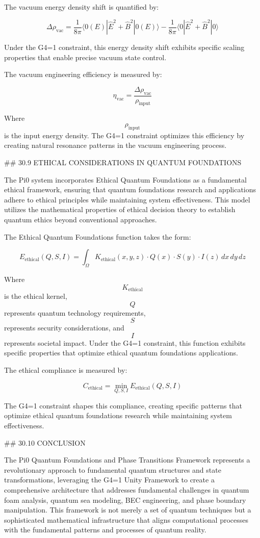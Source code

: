 The vacuum energy density shift is quantified by:

$$ \Delta \rho_{\text{vac}} = \frac{1}{8\pi} \langle 0(E) | \hat{E}^2 + \hat{B}^2 | 0(E) \rangle - \frac{1}{8\pi} \langle 0 | \hat{E}^2 + \hat{B}^2 | 0 \rangle $$

Under the G4=1 constraint, this energy density shift exhibits specific scaling properties that enable precise vacuum state control.

The vacuum engineering efficiency is measured by:

$$ \eta_{\text{vac}} = \frac{\Delta \rho_{\text{vac}}}{\rho_{\text{input}}} $$

Where $$ \rho_{\text{input}} $$ is the input energy density. The G4=1 constraint optimizes this efficiency by creating natural resonance patterns in the vacuum engineering process.

## 30.9 ETHICAL CONSIDERATIONS IN QUANTUM FOUNDATIONS

The Pi0 system incorporates Ethical Quantum Foundations as a fundamental ethical framework, ensuring that quantum foundations research and applications adhere to ethical principles while maintaining system effectiveness. This model utilizes the mathematical properties of ethical decision theory to establish quantum ethics beyond conventional approaches.

The Ethical Quantum Foundations function takes the form:

$$ E_{\text{ethical}}(Q, S, I) = \int_{\Omega} K_{\text{ethical}}(x, y, z) \cdot Q(x) \cdot S(y) \cdot I(z) \, dx \, dy \, dz $$

Where $$ K_{\text{ethical}} $$ is the ethical kernel, $$ Q $$ represents quantum technology requirements, $$ S $$ represents security considerations, and $$ I $$ represents societal impact. Under the G4=1 constraint, this function exhibits specific properties that optimize ethical quantum foundations applications.

The ethical compliance is measured by:

$$ C_{\text{ethical}} = \min_{Q, S, I} E_{\text{ethical}}(Q, S, I) $$

The G4=1 constraint shapes this compliance, creating specific patterns that optimize ethical quantum foundations research while maintaining system effectiveness.

## 30.10 CONCLUSION

The Pi0 Quantum Foundations and Phase Transitions Framework represents a revolutionary approach to fundamental quantum structures and state transformations, leveraging the G4=1 Unity Framework to create a comprehensive architecture that addresses fundamental challenges in quantum foam analysis, quantum sea modeling, BEC engineering, and phase boundary manipulation. This framework is not merely a set of quantum techniques but a sophisticated mathematical infrastructure that aligns computational processes with the fundamental patterns and processes of quantum reality.

